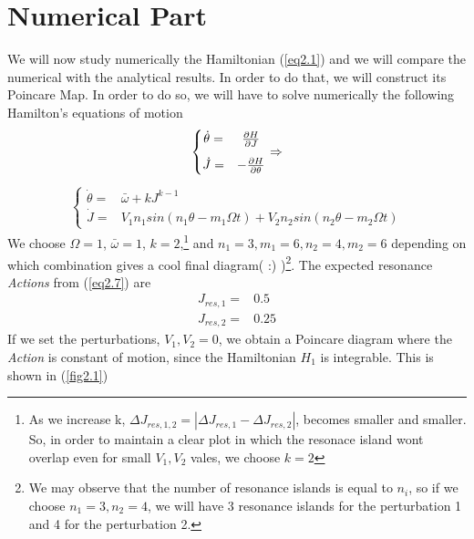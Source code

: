 \section{Numerical Part}
%

We will now study numerically the Hamiltonian (\ref{eq2.1}) and we will compare the numerical with the analytical results. In order to do that, we will construct its Poincare Map. In order to do so, we will have to solve numerically the following Hamilton's equations of motion
	\begin{align*}
	\left\{
		\begin{matrix}
			\dot{\theta} =& \pdv{H}{J     }  \vspace{0.3cm}\\
			\dot{J     } =& -\pdv{H}{\theta}
		\end{matrix}  \right. \Rightarrow \\
	\end{align*}\vspace{-1.2cm}
	\begin{align*}
		\left\{
		\begin{matrix}
			\dot{\theta} =& \bar{\omega} + kJ^{k-1} \\
			\dot{J     } =& V_1n_1sin(n_1\theta-m_1\Omega t) + V_2n_2sin(n_2\theta-m_2\Omega t)
		\end{matrix}  \right.
	\end{align*}
	We choose $\Omega=1$, $\bar{\omega}=1$, $k=2$,\footnote{As we increase k, $\Delta J_{res,1,2}=|\Delta J_{res,1}-\Delta J_{res,2}|$, becomes smaller and smaller. So, in order to maintain a clear plot in which the resonace island wont overlap even for small $V_1,V_2$ vales, we choose $k=2$}
	and $n_1=3,m_1=6,n_2=4,m_2=6$ depending on which combination gives a cool final diagram( :) )\footnote{We may observe that the number of resonance islands is equal to $n_i$, so if we choose $n_1=3,n_2=4$, we will have 3 resonance islands for the perturbation 1 and 4 for the perturbation 2.}.
	The expected resonance \textit{Actions} from (\ref{eq2.7}) are 
		\begin{align*}
			J_{res,1} = & 0.5\\ 
			J_{res,2} = & 0.25 
		\end{align*}
	If we set the perturbations, $V_1,V_2=0$, we obtain a Poincare diagram where the \textit{Action} is constant of motion, since the Hamiltonian $H_1$ is integrable. This is shown in (\ref{fig2.1})
